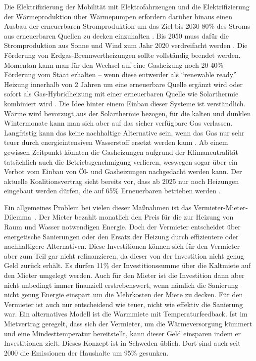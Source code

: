 Die Elektrifizierung der Mobilität mit Elektrofahrzeugen und die Elektrifizierung der Wärmeproduktion über Wärmepumpen erfordern darüber hinaus einen Ausbau der erneuerbaren Stromproduktion um das Ziel bis 2030 80\% des Stroms aus erneuerbaren Quellen zu decken einzuhalten \cite{clausen2022}. Bis 2050 muss dafür die Stromproduktion aus Sonne und Wind zum Jahr 2020 verdreifacht werden \cite{agora-wasserstoff}.
Die Förderung von Erdgas-Brennwertheizungen sollte vollständig beendet werden. Momentan kann man für den Wechsel auf eine Gasheizung noch 20-40\% Förderung vom Staat erhalten -- wenn diese entwerder als ``renewable ready'' Heizung innerhalb von 2 Jahren um eine erneuerbare Quelle ergänzt wird oder sofort als Gas-Hybridheizung mit einer erneuerbaren Quelle wie Solarthermie kombiniert wird \cite{gasheizung-foerderung}. Die Idee hinter einem Einbau dieser Systeme ist verständlich. Wärme wird bevorzugt aus der Solarthermie bezogen, für die kalten und dunklen Wintermonate kann man sich aber auf das sicher verfügbare Gas verlassen. Langfristig kann das keine nachhaltige Alternative sein, wenn das Gas nur sehr teuer durch energieintensiven Wasserstoff ersetzt werden kann \cite{agora-wasserstoff}. Ab einem gewissen Zeitpunkt könnten die Gasheizungen aufgrund der Klimaneutralität tatsächlich auch die Betriebsgenehmigung verlieren, weswegen sogar über ein Verbot vom Einbau von Öl- und Gasheizungen nachgedacht werden kann. Der aktuelle Koalitionsvertrag sieht bereits vor, dass ab 2025 nur noch Heizungen eingebaut werden dürfen, die auf 65\% Erneuerbaren betrieben werden \cite{clausen2022}.

Ein allgemeines Problem bei vielen dieser Maßnahmen ist das Vermieter-Mieter-\\Dilemma~\cite{agora-mieterschutz-klimaschutz}. 
Der Mieter bezahlt monatlich den Preis für die zur Heizung von Raum und Wasser notwendigen Energie.
Doch der Vermieter entscheidet über energetische Sanierungen oder den Ersatz der Heizung durch effizientere oder nachhaltigere Alternativen. Diese Investitionen können sich für den Vermieter aber zum Teil gar nicht refinanzieren, da dieser von der Investition nicht genug Geld zurück erhält. Es dürfen 11\% der Investitionssumme über die Kaltmiete auf den Mieter umgelegt werden. Auch für den Mieter ist die Investition dann aber nicht unbedingt immer finanziell erstrebenswert, wenn nämlich die Sanierung nicht genug Energie einspart um die Mehrkosten der Miete zu decken. Für den Vermieter ist auch nur entscheidend wie teuer, nicht wie effektiv die Sanierung war. Ein alternatives Modell ist die Warmmiete mit Temperaturfeedback. Ist im Mietvertrag geregelt, dass sich der Vermieter, um die Wärmeversorgung kümmert und eine Mindesttemperatur bereitstellt, kann dieser Geld einsparen indem er Investitionen zielt. Dieses Konzept ist in Schweden üblich. Dort sind auch seit 2000 die Emissionen der Haushalte um 95\% gesunken.


